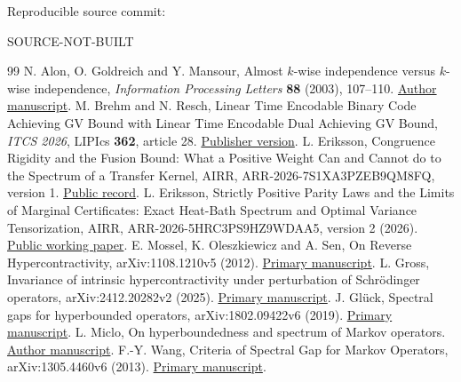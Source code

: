 \documentclass[11pt]{article}
\providecommand{\SourceCommit}{SOURCE-NOT-BUILT}
\begin{document}
\smallskip\noindent
Reproducible source commit:\par\noindent
{\small\ttfamily\SourceCommit}

\begin{thebibliography}{99}
N. Alon, O. Goldreich and Y. Mansour,
Almost $k$-wise independence versus $k$-wise independence,
\emph{Information Processing Letters} \textbf{88} (2003), 107--110.
\href{https://www.wisdom.weizmann.ac.il/~oded/PSX/agm.pdf}{Author manuscript}.
M. Brehm and N. Resch,
Linear Time Encodable Binary Code Achieving GV Bound with Linear Time
Encodable Dual Achieving GV Bound,
\emph{ITCS 2026}, LIPIcs \textbf{362}, article 28.
\href{https://doi.org/10.4230/LIPIcs.ITCS.2026.28}{Publisher version}.
L. Eriksson,
Congruence Rigidity and the Fusion Bound: What a Positive Weight Can and
Cannot do to the Spectrum of a Transfer Kernel,
AIRR, ARR-2026-7S1XA3PZEB9QM8FQ, version 1.
\href{https://airr.science/papers/ARR-2026-7S1XA3PZEB9QM8FQ/versions/v1/}{Public record}.
L. Eriksson,
Strictly Positive Parity Laws and the Limits of Marginal Certificates:
Exact Heat-Bath Spectrum and Optimal Variance Tensorization,
AIRR, ARR-2026-5HRC3PS9HZ9WDAA5, version 2 (2026).
\href{https://airr.science/papers/ARR-2026-5HRC3PS9HZ9WDAA5/versions/v2/}{Public working paper}.
E. Mossel, K. Oleszkiewicz and A. Sen,
On Reverse Hypercontractivity, arXiv:1108.1210v5 (2012).
\href{https://arxiv.org/abs/1108.1210}{Primary manuscript}.
L. Gross, Invariance of intrinsic hypercontractivity under perturbation of
Schr\"odinger operators, arXiv:2412.20282v2 (2025).
\href{https://arxiv.org/abs/2412.20282}{Primary manuscript}.
J. Gl\"uck, Spectral gaps for hyperbounded operators,
arXiv:1802.09422v6 (2019).
\href{https://arxiv.org/abs/1802.09422}{Primary manuscript}.
L. Miclo, On hyperboundedness and spectrum of Markov operators.
\href{https://perso.math.univ-toulouse.fr/miclo/files/2012/04/hyperboundedness.pdf}{Author manuscript}.
F.-Y. Wang, Criteria of Spectral Gap for Markov Operators,
arXiv:1305.4460v6 (2013).
\href{https://arxiv.org/abs/1305.4460v6}{Primary manuscript}.
\end{thebibliography}
\end{document}

